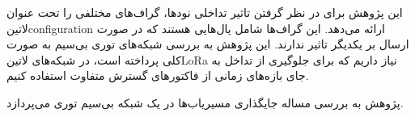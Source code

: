 این پژوهش برای در نظر گرفتن تاثیر تداخلی نودها، گراف‌های مختلفی را تحت عنوان ‌لاتین{configuration} ارائه می‌دهد. این گراف‌ها شامل یال‌هایی هستند که در صورت
ارسال بر یکدیگر تاثیر ندارند.
این پژوهش به بررسی شبکه‌های توری بی‌سیم به صورت کلی پرداخته است، در شبکه‌های ‌لاتین{LoRa} نیاز داریم که برای جلوگیری از تداخل به جای بازه‌های زمانی از فاکتورهای گسترش متفاوت
استفاده کنیم.


پژوهش  به بررسی مساله جایگذاری مسیریاب‌ها در یک شبکه بی‌سیم توری می‌پردازد.
